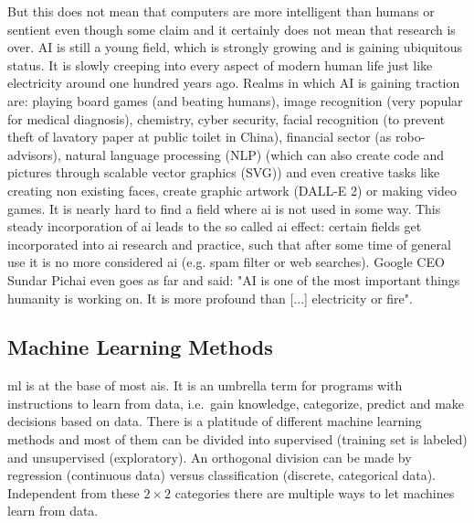 But this does not mean that computers are more intelligent than humans or \linebreak[4] sentient\cite{searle1980,searle1999married} even though some claim\cite{tiku2022google} and it certainly does not mean that research is over. 
AI is still a young field, which is strongly growing and is gaining ubiquitous status. 
It is slowly creeping into every aspect of modern human life just like electricity around one hundred years ago. 
Realms in which AI is gaining traction are: 
%
playing board games (and beating humans)\cite{Silver2017,Feng1999,Campbell2002}, 
image recognition (very popular for medical diagnosis)\cite{Li2020,Deo2015,Topol2019,Fujiyoshi2019}, 
chemistry\cite{Westermayr2019,goh2017chemception,jha2018elemnet}, 
cyber security\cite{Sarker2021},
facial recognition (to prevent theft of lavatory paper at public toilet in China\cite{Andrews2017}),
financial sector (as robo-advisors)\cite{Littman2021},
natural language processing (NLP)\cite{Koroteev2021,Liu2021gpt,Parviainen2021} 
(which can also create code and pictures through scalable vector graphics (SVG))
and even creative tasks like 
creating non existing faces\cite{Mansourifar2020}, 
create graphic artwork (DALL-E 2)\cite{Marcus2022} or 
making video games\cite{Guzdial2016}.
%
It is nearly hard to find a field where \gls{ai} is not used in some way. 
This steady incorporation of \gls{ai} leads to the so called \gls{ai} effect\cite{McCorduck1982,ai100}: 
certain fields get incorporated into \gls{ai} research and practice,
such that after some time of general use it is no more considered \gls{ai} (e.g. spam filter or web searches).
Google CEO Sundar Pichai even goes as far and said: 
"AI is one of the most important things humanity is working on. It is more profound than [...] electricity or fire"\cite{Hassan2020}.

%
\subsection{Machine Learning Methods}
\label{sec:ml-methods}
%
\Gls{ml} is at the base of most \gls{ai}s.
It is an umbrella term for programs with instructions to learn from data, i.e.\ gain knowledge, categorize, predict and make decisions based on data. 
%
There is a platitude of different machine learning methods and most of them can be divided into supervised (training set is labeled) and unsupervised (exploratory).  
An orthogonal division can be made by regression (continuous data) versus classification (discrete, categorical data). 
Independent from these $2\times2$ categories there are multiple ways to let machines learn from data.


